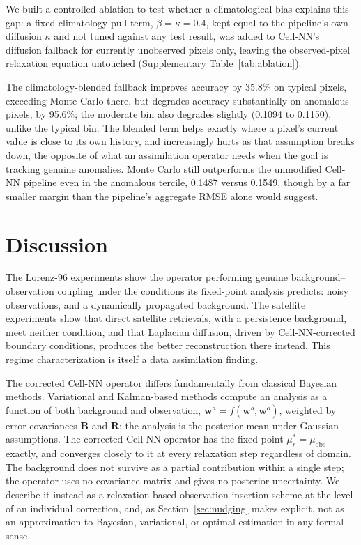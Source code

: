 \documentclass[final,5p,times,twocolumn,authoryear]{elsarticle}
\begin{document}
We built a controlled ablation to test whether a climatological bias
explains this gap: a fixed climatology-pull term, $\beta=\kappa=0.4$,
kept equal to the pipeline's own diffusion $\kappa$ and not tuned
against any test result, was added to Cell-NN's diffusion fallback
for currently unobserved pixels only, leaving the observed-pixel
relaxation equation untouched (Supplementary Table~\ref{tab:ablation}).

The climatology-blended fallback improves accuracy by 35.8\% on
typical pixels, exceeding Monte Carlo there, but degrades accuracy
substantially on anomalous pixels, by 95.6\%; the moderate bin also
degrades slightly (0.1094 to 0.1150), unlike the typical bin. The
blended term helps exactly where a pixel's current value is close to
its own history, and increasingly hurts as that assumption breaks
down, the opposite of what an assimilation operator needs when the
goal is tracking genuine anomalies. Monte Carlo still outperforms the
unmodified Cell-NN pipeline even in the anomalous tercile, 0.1487
versus 0.1549, though by a far smaller margin than the pipeline's
aggregate RMSE alone would suggest.

\FloatBarrier
\section{Discussion}
\label{sec:discussion}

The Lorenz-96 experiments show the operator performing genuine
background--observation coupling under the conditions its fixed-point
analysis predicts: noisy observations, and a dynamically propagated
background. The satellite experiments show that direct satellite
retrievals, with a persistence background, meet neither condition,
and that Laplacian diffusion, driven by Cell-NN-corrected boundary
conditions, produces the better reconstruction there instead. This
regime characterization is itself a data assimilation finding.

The corrected Cell-NN operator differs fundamentally from classical
Bayesian methods. Variational and Kalman-based methods compute an
analysis as a function of both background and observation,
$\mathbf{w}^a = f(\mathbf{w}^b, \mathbf{w}^o)$, weighted by error
covariances $\mathbf{B}$ and $\mathbf{R}$; the analysis is the
posterior mean under Gaussian assumptions. The corrected Cell-NN
operator has the fixed point $\mu_r^\ast = \mu_\text{obs}$ exactly,
and converges closely to it at every relaxation step regardless of
domain. The background does not survive as a partial contribution
within a single step; the operator uses no covariance matrix and
gives no posterior uncertainty. We describe it instead as a
relaxation-based observation-insertion scheme at the level of an
individual correction, and, as Section~\ref{sec:nudging} makes
explicit, not as an approximation to Bayesian, variational, or
optimal estimation in any formal sense.
\end{document}
